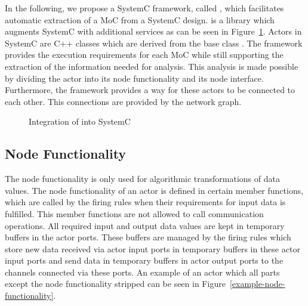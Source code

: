 In the following, we propose a SystemC framework, called \SysteMoC, which
facilitates automatic extraction of a MoC from a SystemC design. \SysteMoC{}
is a library which augments SystemC with additional services as
can be seen in Figure~\ref{fig:SysteMoC-SystemC-Integration}.
Actors in SystemC are C++ classes which are derived from the base class .
The \SysteMoC{} framework provides the execution requirements for each MoC while
still supporting the extraction of the information needed for analysis.
This analysis is made possible by dividing the actor into its
node functionality and its node interface.
Furthermore, the \SysteMoC{} framework provides a way for these
actors to be connected to each other. This connections
are provided by the network graph.

\begin{figure}[h]
\centering

\caption{Integration of \SysteMoC{} into SystemC}
\label{fig:SysteMoC-SystemC-Integration}
\end{figure}

\subsection{Node Functionality}
The node functionality is only used for algorithmic transformations of data values.
The node functionality of an actor is defined in certain member functions,
which are called by the firing rules when their requirements for input data
is fulfilled. This member functions are not allowed to call communication
operations. All required input and output data values are kept in temporary buffers
in the actor ports. These buffers are managed by the firing rules which store
new data received via actor input ports in temporary buffers in these
actor input ports and send data in temporary buffers in actor output ports
to the channels connected via these ports. An example of an actor which all parts
except the node functionality stripped can be seen in Figure~\ref{example-node-functionality}.


